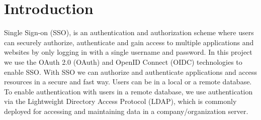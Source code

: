 \section{Introduction}

Single Sign-on (SSO), is an authentication and authorization scheme where users can securely authorize, authenticate and gain access to multiple applications and websites by only logging in with a single username and password. In this project we use the OAuth 2.0 (OAuth) and OpenID Connect (OIDC) technologies to enable SSO. With SSO we can authorize and authenticate applications and access resources in a secure and fast way. Users can be in a local or a remote database. To enable authentication with users in a remote database, we use authentication via the Lightweight Directory Access Protocol (LDAP), which is commonly deployed for accessing and maintaining data in a company/organization server.
